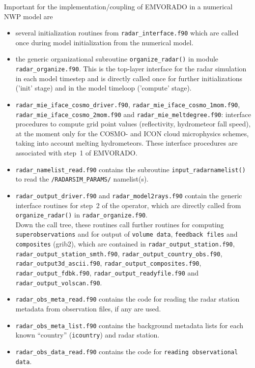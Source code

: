 \documentclass[10pt,a4paper,twoside,headinclude,footinclude,parskip=half]{scrartcl}
\newcommand{\srcform}[1]{\mbox{\texttt{#1}}\xspace}%
\begin{document}
Important for the implementation/coupling of EMVORADO in a numerical NWP model are
\begin{itemize}
\item several initialization routines from \srcform{radar_interface.f90} which are called once during model initialization from
  the numerical model.
\item the generic organizational subroutine \srcform{organize_radar()} in module \srcform{radar_organize.f90}. This is the
  top-layer interface for the radar simulation in each model timestep and is directly called once for further initializations ('init' stage) and in the model timeloop ('compute' stage).
\item \srcform{radar_mie_iface_cosmo_driver.f90}, \srcform{radar_mie_iface_cosmo_1mom.f90}, \srcform{radar_mie_iface_cosmo_2mom.f90} and \srcform{radar_mie_meltdegree.f90}: interface procedures
  to compute grid point values (reflectivity, hydrometeor fall speed), at the moment only for
  the COSMO- and ICON cloud microphysics schemes, taking into account melting hydrometeors.
  These interface procedures are associated with step~1 of EMVORADO.
\item \srcform{radar_namelist_read.f90} contains the subroutine \srcform{input_radarnamelist()} to
  read the \srcform{/RADARSIM_PARAMS/} namelist(s).
\item \srcform{radar_output_driver.f90} and \srcform{radar_model2rays.f90} contain the generic interface routines for step~2 of the operator, which
  are directly called from \srcform{organize_radar()} in \srcform{radar_organize.f90}.\\
  Down the call tree, these routines call further routines for computing \srcform{superobservations}
  and for output of \srcform{volume data}, \srcform{feedback files} and \srcform{composites} (grib2), which are contained in
  \srcform{radar_output_station.f90}, \srcform{radar_output_station_smth.f90}, \srcform{radar_output_country_obs.f90},
  \srcform{radar_output3d_ascii.f90}, \srcform{radar_output_composites.f90}, \srcform{radar_output_fdbk.f90}, \srcform{radar_output_readyfile.f90} and
  \srcform{radar_output_volscan.f90}.
\item \srcform{radar_obs_meta_read.f90} contains the code for reading the radar station metadata from observation files, if any are used.
\item \srcform{radar_obs_meta_list.f90} contains the background metadata lists for each known
  ``country'' (\srcform{icountry}) and radar station.
\item \srcform{radar_obs_data_read.f90} contains the code for \srcform{reading observational data}.

\end{itemize}
\end{document}
